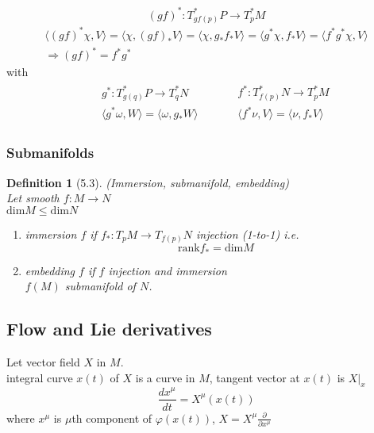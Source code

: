 \documentclass[twoside]{amsart}
\newtheorem{definition}{Definition}
\newcommand{\exercisehead}[1]
  {\smallskip
   \noindent{\large\bf Exercise #1.}
   }
\begin{document}
\exercisehead{5.5} \[
(gf)^*: T^*_{ gf(p)}P \to T^*_p M
\]
\[
\begin{gathered}
  \langle (gf)^* \chi, V \rangle = \langle \chi, (gf)_* V \rangle = \langle \chi, g_* f_*V \rangle = \langle g^* \chi, f_* V \rangle = \langle f^* g^* \chi, V \rangle \\
  \Longrightarrow (gf)^* = f^* g^*
\end{gathered}
\]
with
\[
\begin{aligned}
  & \begin{aligned}
      & g^* : T^*_{g(q)}P \to T^*_q N \\ 
  & \langle g^* \omega , W \rangle = \langle \omega, g_* W \rangle 
\end{aligned} \quad \, 
  & \begin{aligned}
      & f^* : T^*_{f(p)}N \to T^*_p M \\ 
      & \langle f^* \nu , V \rangle = \langle \nu, f_* V \rangle
    \end{aligned}
\end{aligned}
\]

\subsubsection{ Submanifolds}

\begin{definition}[5.3] (Immersion, submanifold, embedding) \\
Let smooth $f: M \to N $ \\
$\text{dim}{M} \leq \text{dim}{N}$ 

\begin{enumerate}
\item[(a)] immersion $f$ if $f_* : T_pM \to T_{f(p)} N$ injection (1-to-1) i.e. 
\[
\text{rank}{f_*} = \text{dim}{M}
\]
\item[(b)] embedding $f$ if $f$ injection and immersion \\
$f(M)$ submanifold of $N$.  
\end{enumerate}
\end{definition}

\subsection{ Flow and Lie derivatives }


Let vector field $X$ in $M$.  \\
integral curve $x(t)$ of $X$ is a curve in $M$, tangent vector at $x(t)$ is $\left. X \right|_x$ 
\[
\frac{dx^{\mu}}{ dt} = X^{\mu}(x(t))
\]
where $x^{\mu}$ is $\mu$th component of $\varphi(x(t))$, $X = X^{\mu} \frac{ \partial }{ \partial x^{\mu }}$
\end{document}
